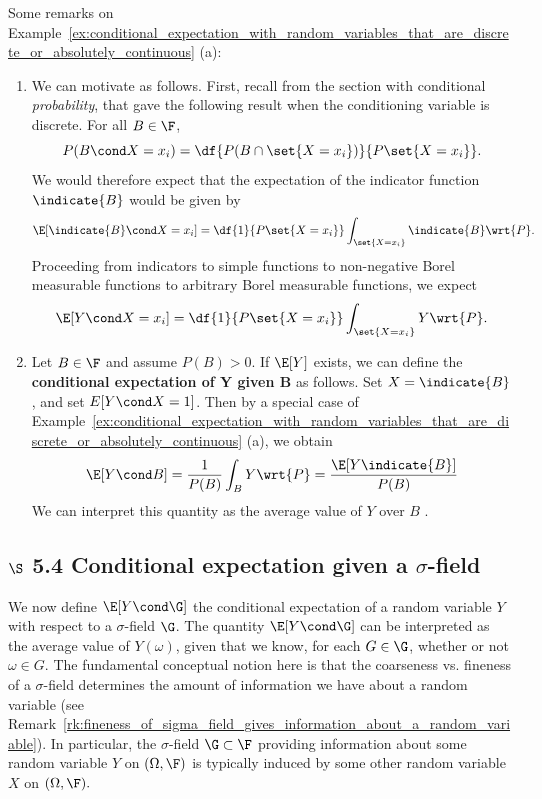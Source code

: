 \documentclass{article} %
\begin{document}
\begin{remark}
Some remarks on Example~\ref{ex:conditional_expectation_with_random_variables_that_are_discrete_or_absolutely_continuous} (a):
\begin{enumerate}
\item We can motivate  as follows.  First, recall from the section with conditional \textit{probability}, that   gave the following result when the conditioning variable is discrete.  For all $B \in \F$,
\[ P(B \cond X=x_i) = \df{P(B \cap \set{X=x_i})}{P\set{X=x_i}}.\]
We would therefore expect that the expectation of the indicator function $\indicate{B}$ would be given by 
\[ \E[\indicate{B} \cond X=x_i] = \df{1}{P\set{X=x_i}} \int_{\set{X=x_i}} \indicate{B} \wrt{P}.\]
Proceeding from indicators to simple functions to non-negative Borel measurable functions to arbitrary Borel measurable functions, we expect
\[ \E[Y \cond X=x_i] = \df{1}{P\set{X=x_i}} \int_{\set{X=x_i}} Y \wrt{P}.\]
\item Let $B \in \F$ and assume $P(B)>0$.  If $\E[Y]$ exists, we can define the \textbf{conditional expectation of Y given B} as follows.  Set $X=\indicate{B}$, and set $E[Y \cond X=1]$.  Then by a special case of Example~\ref{ex:conditional_expectation_with_random_variables_that_are_discrete_or_absolutely_continuous} (a), we obtain
%
\begin{align}
\E[Y \cond B] = \frac{1}{P(B)} \int_B Y \wrt{P}  = \frac{\E[Y \indicate{B}]}{P(B)} 	
\label{eqn:avg_value_of_Y_over_B}
\end{align} 
%
We can interpret this quantity as the average value of $Y$ over $B$ \cite[pp.224]{durrett2010probability}.
\end{enumerate}
\end{remark}


\subsection{$\S$ 5.4 Conditional expectation given a $\sigma$-field}

We now define $\E[Y \cond \G]$ the conditional expectation of a random variable $Y$ with respect to a $\sigma$-field $\G$.   The quantity $\E[Y \cond \G]$ can be interpreted as the average value of $Y(\omega)$, given that we know, for each $G \in \G$, whether or not $\omega \in G$. The fundamental conceptual notion here is that the coarseness vs. fineness of a $\sigma$-field determines the amount of information we have about a random variable (see Remark~\ref {rk:fineness_of_sigma_field_gives_information_about_a_random_variable}).  In particular, the $\sigma$-field $\G \subset \F$ providing information about some random variable $Y$ on $(\Omega, \F)$ is typically induced by some other random variable $X$ on $(\Omega,\F).$
\end{document}
